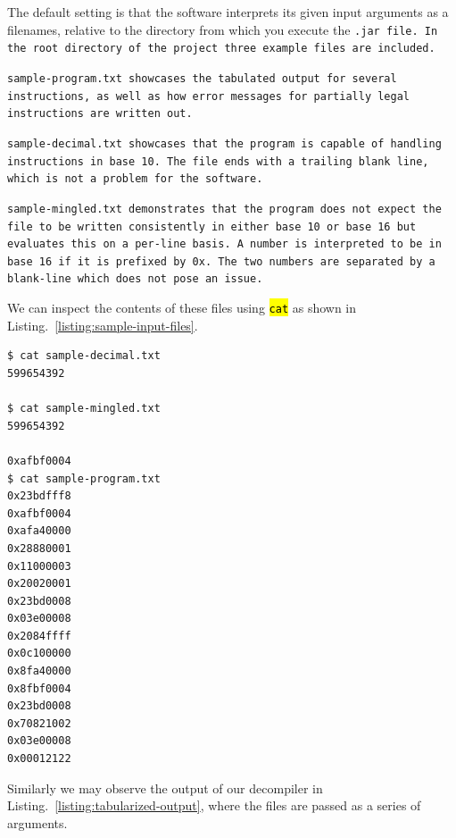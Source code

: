 \documentclass[a4paper]{article}
\newcommand{\hlc}[2][inlinecode]{{\sethlcolor{#1} \texttt{\hl{#2}}}}
\begin{document}
The default setting is that the software interprets its given input
arguments as a filenames, relative to the directory from which you
execute the \tt{.jar} file. In the root directory of the project three
example files are included.

\tt{sample-program.txt} showcases the tabulated output for several
instructions, as well as how error messages for partially legal
instructions are written out.

\tt{sample-decimal.txt} showcases that the program is capable
of handling instructions in base 10. The file ends with
a trailing blank line, which is not a problem for the software.

\tt{sample-mingled.txt} demonstrates that the program does not expect
the file to be written consistently in either base 10 or base 16 but
evaluates this on a per-line basis. A number is interpreted
to be in base 16 if it is prefixed by \tt{0x}. The two numbers
are separated by a blank-line which does not pose an issue.

We can inspect the contents of these files using \hlc{cat}
as shown in Listing.~\ref{listing:sample-input-files}.

\begin{minipage}{\linewidth}
\begin{lstlisting}[basicstyle=\small, 
    language=bash, 
    caption=Sample input files,
    label=listing:sample-input-files,
    backgroundcolor=\color{mintedbackground}]
$ cat sample-decimal.txt 
599654392

$ cat sample-mingled.txt 
599654392

0xafbf0004
$ cat sample-program.txt 
0x23bdfff8
0xafbf0004
0xafa40000
0x28880001
0x11000003
0x20020001
0x23bd0008
0x03e00008
0x2084ffff
0x0c100000
0x8fa40000
0x8fbf0004
0x23bd0008
0x70821002
0x03e00008
0x00012122
\end{lstlisting}
\end{minipage}

Similarly we may observe the output of our decompiler in
Listing.~\ref{listing:tabularized-output}, where the
files are passed as a series of arguments.
\end{document}

